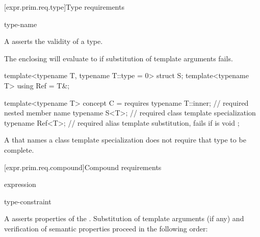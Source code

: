 [expr.prim.req.type]{Type requirements}
%

\begin{bnf}
\br
      type-name \terminal{;}
\end{bnf}

\pnum
A  asserts the validity of a type.
\begin{note}
The enclosing  will evaluate to 
if substitution of template arguments fails.
\end{note}
\begin{example}
\begin{codeblock}
template<typename T, typename T::type = 0> struct S;
template<typename T> using Ref = T&;

template<typename T> concept C = requires {
  typename T::inner;    // required nested member name
  typename S<T>;        // required class template specialization
  typename Ref<T>;      // required alias template substitution, fails if  is void
};
\end{codeblock}
\end{example}

\pnum
A  that names a class template specialization
does not require that type to be complete.

[expr.prim.req.compound]{Compound requirements}
%

\begin{bnf}
\br
    \terminal{\{} expression \terminal{\}}   \terminal{;}
\end{bnf}

\begin{bnf}
\br
    \terminal{->} type-constraint
\end{bnf}

\pnum
A  asserts properties
of the  . Substitution
of template arguments (if any) and verification of
semantic properties proceed in the following order:

